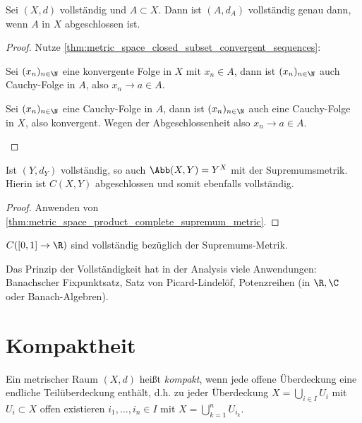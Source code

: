 \begin{lem}
	Sei $(X,d)$ vollständig und $A \subset X$.
	Dann ist $(A,d_A)$ vollständig genau dann, wenn $A$ in $X$ abgeschlossen ist.
	\begin{proof}
		Nutze \ref{thm:metric_space_closed_subset_convergent_sequences}:
		\begin{segnb}{\ProofImplication}
			Sei $(x_n)_{n\in \N}$ eine konvergente Folge in $X$ mit $x_n \in A$, dann ist $(x_n)_{n\in \N}$ auch Cauchy-Folge in $A$, also $x_n \to a \in A$.
		\end{segnb}
		\begin{segnb}{\ProofImplication*}
			Sei $(x_n)_{n\in\N}$ eine Cauchy-Folge in $A$, dann ist $(x_n)_{n\in\N}$ auch eine Cauchy-Folge in $X$, also konvergent.
			Wegen der Abgeschlossenheit also $x_n \to a \in A$.
		\end{segnb}
	\end{proof}
\end{lem}

\begin{st}
	Ist $(Y,d_Y)$ vollständig, so auch $\Abb(X,Y) = Y^X$ mit der Supremumsmetrik.
	Hierin ist $C(X,Y)$ abgeschlossen und somit ebenfalls vollständig.
	\begin{proof}
		Anwenden von \ref{thm:metric_space_product_complete_supremum_metric}.
	\end{proof}
\end{st}

\begin{ex}
	$C([0,1] \to \R)$ sind vollständig bezüglich der Supremums-Metrik.
\end{ex}

Das Prinzip der Vollständigkeit hat in der Analysis viele Anwendungen: Banachscher Fixpunktsatz, Satz von Picard-Lindelöf, Potenzreihen (in $\R, \C$ oder Banach-Algebren).


\section{Kompaktheit}


\begin{df} \label{df:compact_metric_space}
	Ein metrischer Raum $(X,d)$ heißt \emph{kompakt}, wenn jede offene Überdeckung eine endliche Teilüberdeckung enthält, d.h. zu jeder Überdeckung $X = \bigcup_{i \in I} U_i$ mit $U_i \subset X$ offen existieren $i_1, \dotsc, i_n \in I$ mit $X = \bigcup_{k=1}^n U_{i_k}$.
\end{df}


